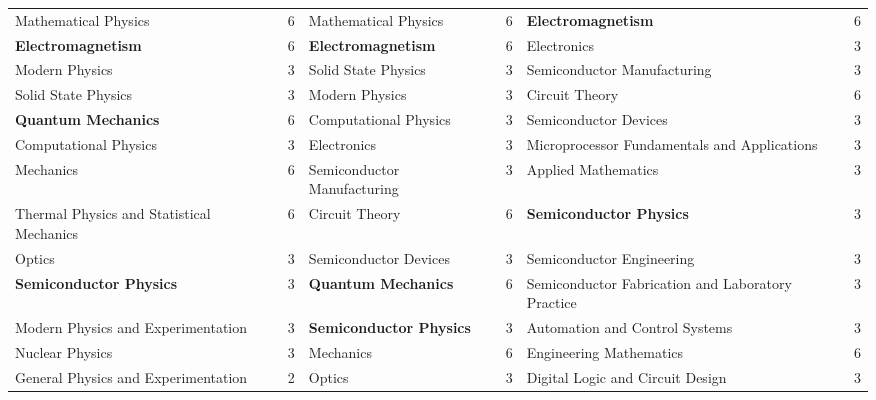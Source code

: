 \documentclass{bmcart}
\begin{document}
\begin{landscape}
\begin{longtable}{p{3.5cm}|p{1cm}|p{7cm}|p{1cm}|p{7cm}|p{1cm}}
\scriptsize Mathematical Physics & \scriptsize 6 & \scriptsize Mathematical Physics & \scriptsize 6 & \scriptsize \textbf{Electromagnetism} & \scriptsize 6 \\
\scriptsize \textbf{Electromagnetism} & \scriptsize 6 & \scriptsize \textbf{Electromagnetism} & \scriptsize 6 & \scriptsize Electronics & \scriptsize 3 \\
\scriptsize Modern Physics & \scriptsize 3 & \scriptsize Solid State Physics & \scriptsize 3 & \scriptsize Semiconductor Manufacturing & \scriptsize 3 \\
\scriptsize Solid State Physics & \scriptsize 3 & \scriptsize Modern Physics & \scriptsize 3 & \scriptsize Circuit Theory & \scriptsize 6 \\
\scriptsize \textbf{Quantum Mechanics} & \scriptsize 6 & \scriptsize Computational Physics & \scriptsize 3 & \scriptsize Semiconductor Devices & \scriptsize 3 \\
\scriptsize Computational Physics & \scriptsize 3 & \scriptsize Electronics & \scriptsize 3 & \scriptsize Microprocessor Fundamentals and Applications & \scriptsize 3 \\
\scriptsize Mechanics & \scriptsize 6 & \scriptsize Semiconductor Manufacturing & \scriptsize 3 & \scriptsize Applied Mathematics & \scriptsize 3 \\
\scriptsize Thermal Physics and \newline Statistical Mechanics & \scriptsize 6 & \scriptsize Circuit Theory & \scriptsize 6 & \scriptsize \textbf{Semiconductor Physics} & \scriptsize 3 \\
\scriptsize Optics & \scriptsize 3 & \scriptsize Semiconductor Devices & \scriptsize 3 & \scriptsize Semiconductor Engineering & \scriptsize 3 \\
\scriptsize \textbf{Semiconductor Physics} & \scriptsize 3 & \scriptsize \textbf{Quantum Mechanics} & \scriptsize 6 & \scriptsize Semiconductor Fabrication \newline and Laboratory Practice & \scriptsize 3 \\
\scriptsize Modern Physics and \newline Experimentation & \scriptsize 3 & \scriptsize \textbf{Semiconductor Physics} & \scriptsize 3 & \scriptsize Automation and Control Systems & \scriptsize 3 \\
\scriptsize Nuclear Physics & \scriptsize 3 & \scriptsize Mechanics & \scriptsize 6 & \scriptsize Engineering Mathematics & \scriptsize 6 \\
\scriptsize General Physics and \newline Experimentation & \scriptsize 2 & \scriptsize Optics & \scriptsize 3 & \scriptsize Digital Logic and Circuit Design & \scriptsize 3 \\

\end{longtable}
\end{landscape}
\end{document}

